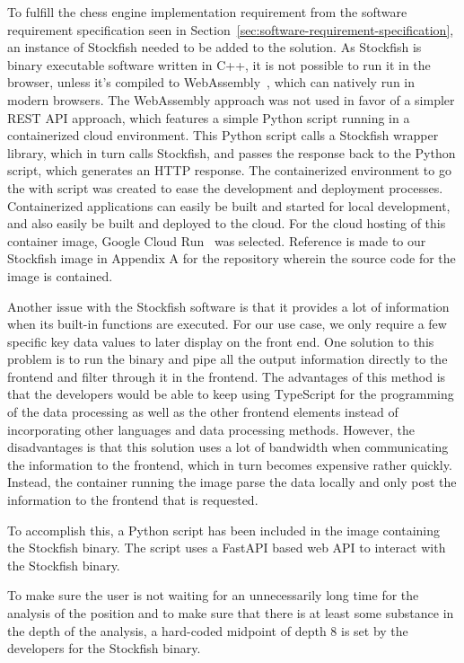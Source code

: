 To fulfill the chess engine implementation requirement from the software requirement specification seen in
Section~\ref{sec:software-requirement-specification}, an instance of Stockfish needed to be added to the solution.
As Stockfish is binary executable software written in C++, it is not possible to run it in the browser,
unless it's compiled to WebAssembly~\cite{web-assembly}, which can natively run in modern browsers.
The WebAssembly approach was not used in favor of a simpler REST API approach,
which features a simple Python script running in a containerized cloud environment.
This Python script calls a Stockfish wrapper library, which in turn calls Stockfish, and passes the response back to
the Python script, which generates an HTTP response.
The containerized environment to go the with script was created to ease the development and deployment processes.
Containerized applications can easily be built and started for local development, and also easily be built and deployed
to the cloud.
For the cloud hosting of this container image, Google Cloud Run~\cite{google-cloud-run} was selected.
Reference is made to our Stockfish image in Appendix A for the repository wherein the source code for the image is
contained.

Another issue with the Stockfish software is that it provides a lot of information when its built-in functions are
executed.
For our use case, we only require a few specific key data values to later display on the front end.
One solution to this problem is to run the binary and pipe all the output information directly to the frontend and
filter through it in the frontend.
The advantages of this method is that the developers would be able to keep using TypeScript for the programming of the
data processing as well as the other frontend elements instead of incorporating other languages and data processing
methods.
However, the disadvantages is that this solution uses a lot of bandwidth when communicating the information to the
frontend, which in turn becomes expensive rather quickly.
Instead, the container running the image parse the data locally and only post the information to the frontend that is
requested.

To accomplish this, a Python script has been included in the image containing the Stockfish binary.
The script uses a FastAPI based web API to interact with the Stockfish binary.

To make sure the user is not waiting for an unnecessarily long time for the analysis of the position and to make sure
that there is at least some substance in the depth of the analysis, a hard-coded midpoint of depth 8 is set by the
developers for the Stockfish binary.

